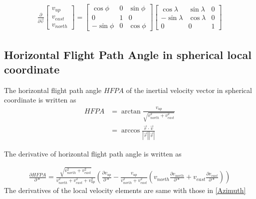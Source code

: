 \documentclass[11pt]{article}
\begin{document}
\begin{equation}
	\begin{aligned}
	\frac{\partial}{\partial \vec{v}}
		\begin{bmatrix}
		v_{up}\\
		v_{east}\\
		v_{north}
		\end{bmatrix} =
		\begin{bmatrix}
		\cos{\phi} & 0 & \sin{\phi}\\
		0 & 1 & 0\\
		-\sin{\phi} & 0 & \cos{\phi}
		\end{bmatrix}
		\begin{bmatrix}
		\cos{\lambda} & \sin{\lambda} & 0\\
		-\sin{\lambda}& \cos{\lambda} & 0\\
		0 & 0 & 1
		\end{bmatrix}
	\end{aligned}
\end{equation}

\subsection{Horizontal Flight Path Angle in spherical local coordinate}
The horizontal flight path angle $HFPA$ of the inertial velocity vector in spherical coordinate is written as
\begin{equation}
	\label{eq:velocity_HFPA}
	\begin{aligned}
		HFPA &= \arctan{\frac{v_{up}}{\sqrt{v_{north}^2 + v_{east}^2}}}\\
		&=\arccos{\frac{\vec{r}\cdot\vec{v}}{|\vec{r}||\vec{v}|}}
	\end{aligned}
\end{equation}

\noindent The derivative of horizontal flight path angle is written as

\begin{equation}
	\label{eq:velocity_HFPA_deriv}
	\begin{aligned}
		\frac{\partial HFPA}{\partial *} =
		\frac{\sqrt{v_{north}^2 + v_{east}^2}}{v_{north}^2 + v_{east}^2 + v_{up}^2}
		\left(
		\frac{\partial v_{up}}{\partial *}
		- \frac{v_{up}}{v_{north}^2 + v_{east}^2}
		\left(
		v_{north}\frac{\partial v_{north}}{\partial *} + v_{east}\frac{\partial v_{east}}{\partial *}
		\right)
		\right)
	\end{aligned}
\end{equation}
The derivatives of the local velocity elements are same with those in \ref{Azimuth}
\end{document}
